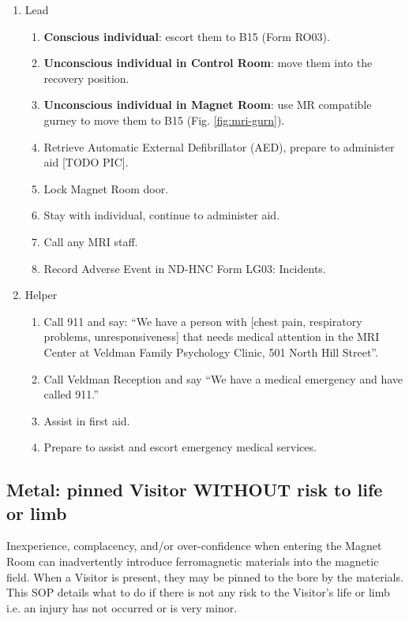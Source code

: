 \documentclass[11pt]{article}
\begin{document}
\begin{enumerate}
	\item Lead
	\begin{enumerate}
		\item \textbf{Conscious individual}: escort them to B15 (Form RO03).
		\item \textbf{Unconscious individual in Control Room}: move them into the recovery position.
		\item \textbf{Unconscious individual in Magnet Room}: use MR compatible gurney to move them to B15 (Fig. \ref{fig:mri-gurn}).
		\item Retrieve Automatic External Defibrillator (AED), prepare to administer aid [TODO PIC].
		\item Lock Magnet Room door.
		\item Stay with individual, continue to administer aid.
		\item Call any MRI staff.
		\item Record Adverse Event in ND-HNC Form LG03: Incidents.
	\end{enumerate}

	\item Helper
	\begin{enumerate}
		\item Call 911 and say: ``We have a person with [chest pain, respiratory problems, unresponsiveness] that needs medical attention in the MRI Center at Veldman Family Psychology Clinic, 501 North Hill Street''.
		\item Call Veldman Reception and say ``We have a medical emergency and have called 911.''
		\item Assist in first aid.
		\item Prepare to assist and escort emergency medical services.
	\end{enumerate}
\end{enumerate}


\subsection{Metal: pinned Visitor \textbf{WITHOUT} risk to life or limb}
\label{ssec:metal-no-risk}

Inexperience, complacency, and/or over-confidence when entering the Magnet Room can inadvertently introduce ferromagnetic materials into the magnetic field. When a Visitor is present, they may be pinned to the bore by the materials. This SOP details what to do if there is not any risk to the Visitor's life or limb i.e. an injury has not occurred or is very minor.
\end{document}
